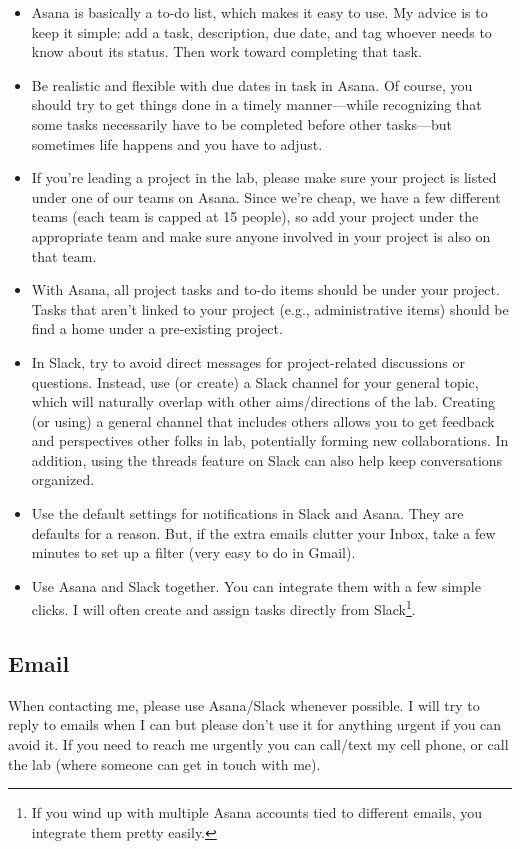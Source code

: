 \documentclass[letterpaper,12pt,oneside]{memoir}
\begin{document}
\begin{itemize}
\item Asana is basically a to-do list, which makes it easy to use. My advice is to keep it simple: add a task, description, due date, and tag whoever needs to know about its status. Then work toward completing that task.
\item Be realistic and flexible with due dates in task in Asana. Of course, you should try to get things done in a timely manner---while recognizing that some tasks necessarily have to be completed before other tasks---but sometimes life happens and you have to adjust.
\item If you're leading a project in the lab, please make sure your project is listed under one of our teams on Asana. Since we're cheap, we have a few different teams (each team is capped at 15 people), so add your project under the appropriate team and make sure anyone involved in your project is also on that team. 
\item With Asana, all project tasks and to-do items should be under your project. Tasks that aren't linked to your project (e.g., administrative items) should be find a home under a pre-existing project. 
\item In Slack, try to avoid direct messages for project-related discussions or questions. Instead, use (or create) a Slack channel for your general topic, which will naturally overlap with other aims/directions of the lab. Creating (or using) a general channel that includes others allows you to get feedback and perspectives other folks in lab, potentially forming new collaborations. In addition, using the threads feature on Slack can also help keep conversations organized.
\item Use the default settings for notifications in Slack and Asana. They are defaults for a reason. But, if the extra emails clutter your Inbox, take a few minutes to set up a filter (very easy to do in Gmail).
\item Use Asana and Slack together. You can integrate them with a few simple clicks. I will often create and assign tasks directly from Slack\footnote{If you wind up with multiple Asana accounts tied to different emails, you integrate them pretty easily.}.
\end{itemize}

\subsection{Email}
When contacting me, please use Asana/Slack whenever possible. I will try to reply to emails when I can but please don't use it for anything urgent if you can avoid it. If you need to reach me urgently you can call/text my cell phone, or call the lab (where someone can get in touch with me). 
\end{document}
